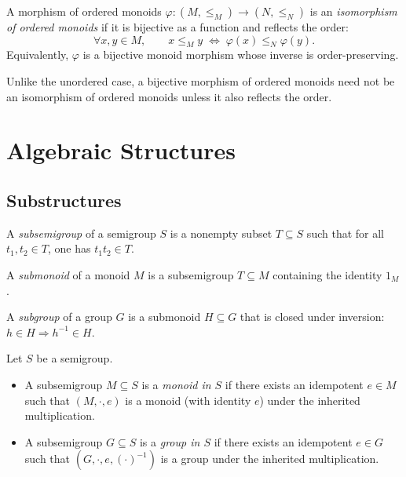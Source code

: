 \begin{definition}
\label{def:ordered-monoid-isomorphism}
A morphism of ordered monoids \(\varphi:(M,\le_M)\to (N,\le_N)\) is an \emph{isomorphism of ordered monoids} if it is bijective as a function and reflects the order:
\[
\forall x,y\in M,\qquad x\le_M y \;\Longleftrightarrow\; \varphi(x)\le_N \varphi(y).
\]
Equivalently, \(\varphi\) is a bijective monoid morphism whose inverse is order-preserving.
\end{definition}

\begin{remark}
Unlike the unordered case, a bijective morphism of ordered monoids need not be an isomorphism of ordered monoids unless it also reflects the order.
\end{remark}

\chapter {Algebraic Structures}

\section{Substructures}

\begin{definition}[Subsemigroup]
\label{def:subsemigroup}
A \emph{subsemigroup} of a semigroup \(S\) is a nonempty subset \(T\subseteq S\) such that for all \(t_1,t_2\in T\), one has \(t_1t_2\in T\).
\end{definition}

\begin{definition}
\label{def:submonoid}
A \emph{submonoid} of a monoid \(M\) is a subsemigroup \(T\subseteq M\) containing the identity \(1_M\).
\end{definition}

\begin{definition}
\label{def:subgroup}
A \emph{subgroup} of a group \(G\) is a submonoid \(H\subseteq G\) that is closed under inversion: \(h\in H\Rightarrow h^{-1}\in H\).
\end{definition}

\begin{definition}
\label{def:internal-monoid-group}
Let \(S\) be a semigroup.
\begin{itemize}
  \item A subsemigroup \(M\subseteq S\) is a \emph{monoid in \(S\)} if there exists an idempotent \(e\in M\) such that \((M,\cdot,e)\) is a monoid (with identity \(e\)) under the inherited multiplication.
  \item A subsemigroup \(G\subseteq S\) is a \emph{group in \(S\)} if there exists an idempotent \(e\in G\) such that \((G,\cdot,e,(\cdot)^{-1})\) is a group under the inherited multiplication.
\end{itemize}
\end{definition}

